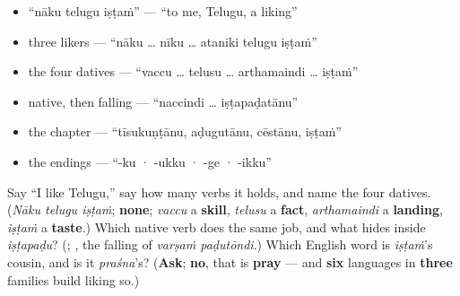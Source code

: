 \begin{itemize}
\raggedright
  \item \textquotedblleft{}nāku telugu iṣṭaṁ\textquotedblright{} — \textquotedblleft{}to me, Telugu, a liking\textquotedblright{}
  \item three likers — \textquotedblleft{}nāku … nīku … ataniki telugu iṣṭaṁ\textquotedblright{}
  \item the four datives — \textquotedblleft{}vaccu … telusu … arthamaindi … iṣṭaṁ\textquotedblright{}
  \item native, then falling — \textquotedblleft{}naccindi … iṣṭapaḍatānu\textquotedblright{}
  \item the chapter — \textquotedblleft{}tīsukuṇṭānu, aḍugutānu, cēstānu, iṣṭaṁ\textquotedblright{}
  \item the endings — \textquotedblleft{}-ku · -ukku · -ge · -ikku\textquotedblright{}
\end{itemize}

\begin{tcolorbox}[breakable,colback=teal!4,colframe=teal!35!black,title={Before you move on}]
Say \textquotedblleft{}I like Telugu,\textquotedblright{} say how many verbs it holds, and name the four datives. (\emph{Nāku telugu iṣṭaṁ}; \textbf{none}; \emph{vaccu} a \textbf{skill}, \emph{telusu} a \textbf{fact}, \emph{arthamaindi} a \textbf{landing}, \emph{iṣṭaṁ} a \textbf{taste}.) Which native verb does the same job, and what hides inside \emph{iṣṭapaḍu}? (\emph{\textbf{}}; \emph{\textbf{}}, the falling of \emph{varṣaṁ paḍutōndi}.) Which English word is \emph{iṣṭaṁ}'s cousin, and is it \emph{praśna}'s? (\textbf{Ask}; \textbf{no}, that is \textbf{pray} — and \textbf{six} languages in \textbf{three} families build liking so.)
\end{tcolorbox}
